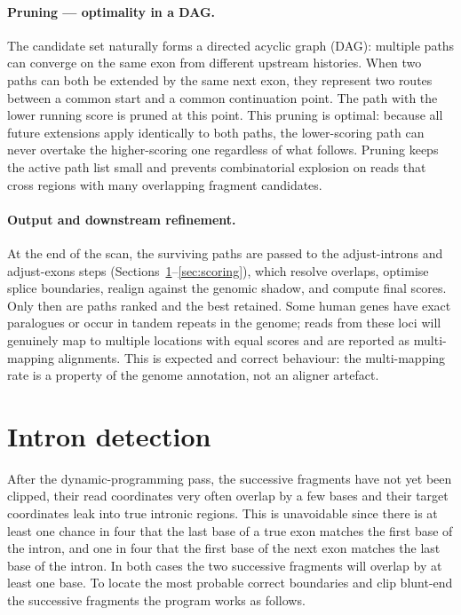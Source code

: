 \documentclass[11pt]{article}
\begin{document}
\paragraph{Pruning --- optimality in a DAG.}
The candidate set naturally forms a directed acyclic graph (DAG):
multiple paths can converge on the same exon from different
upstream histories.
When two paths can both be extended by the same next exon, they
represent two routes between a common start and a common
continuation point.
The path with the lower running score is pruned at this point.
This pruning is optimal: because all future extensions apply
identically to both paths, the lower-scoring path can never
overtake the higher-scoring one regardless of what follows.
Pruning keeps the active path list small and prevents combinatorial
explosion on reads that cross regions with many overlapping
fragment candidates.

\paragraph{Output and downstream refinement.}
At the end of the scan, the surviving paths are passed to the
adjust-introns and adjust-exons steps
(Sections~\ref{sec:adjust_introns}--\ref{sec:scoring}),
which resolve overlaps, optimise splice boundaries, realign
against the genomic shadow, and compute final scores.
Only then are paths ranked and the best retained.
Some human genes have exact paralogues or occur in tandem repeats
in the genome; reads from these loci will genuinely map to multiple
locations with equal scores and are reported as multi-mapping
alignments.
This is expected and correct behaviour: the multi-mapping rate is
a property of the genome annotation, not an aligner artefact.

\section{Intron detection}
\label{sec:adjust_introns}

After the dynamic-programming pass, the successive fragments have not
yet been clipped, their read coordinates very often overlap by a few bases
and their target coordinates leak into true intronic regions.
This is unavoidable since there is at least one chance in four
that the last base of a true exon matches the first base of the intron,
and one in four that the first base of the next exon matches the last base of the intron. In both cases
the two successive fragments will overlap by at least one base.
To locate the most probable correct boundaries and clip blunt-end
the successive fragments the program works as follows.
\end{document}
